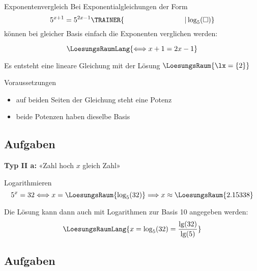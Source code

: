 \begin{rezept}{Exponentenvergleich}{}
Bei Exponentialgleichungen der Form $$5^{x+1} =
5^{2x-1}\TRAINER{\hspace{30mm}| \log_5(\Box{})}$$ können bei
gleicher Basis einfach die Exponenten verglichen werden:

$$\LoesungsRaumLang{\Longleftrightarrow x+1=2x-1}$$


Es entsteht eine lineare Gleichung mit der Lösung $\LoesungsRaum{\lx = \{2\}}$
\end{rezept}

\begin{bemerkung}{Voraussetzungen}{}
  \begin{itemize}
  \item auf beiden Seiten der Gleichung steht eine Potenz
  \item beide Potenzen haben dieselbe Basis
    \end{itemize}
\end{bemerkung}
\newpage


\subsection*{Aufgaben}

\newpage
\textbf{Typ II a:} «Zahl hoch $x$ gleich Zahl»


\begin{rezept}{Logarithmieren}{}
$$5^x=32 \Longleftrightarrow x=\LoesungsRaum{\log_5(32)} \Longrightarrow x \approx \LoesungsRaum{2.15338}$$

Die Lösung kann dann auch mit Logarithmen zur Basis 10 angegeben
werden:
$$\LoesungsRaumLang{x = \log_5(32) = \frac{\lg(32)}{\lg(5)}}$$
\end{rezept}


\subsection*{Aufgaben}



